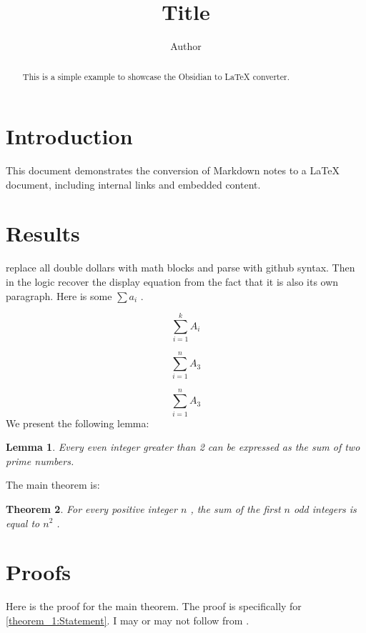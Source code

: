 \documentclass{article}
\title{Title}
\author{Author}
\newtheorem{theorem}{Theorem}
\newtheorem{lemma}[theorem]{Lemma}
\begin{document}
\maketitle
\begin{abstract}
This is a simple example to showcase the Obsidian to LaTeX converter.


\end{abstract}

\section{Introduction}\label{section:Introduction}
This document demonstrates the conversion of Markdown notes to a LaTeX document, including internal links and embedded content.

\section{Results}\label{section:Results}
replace all double dollars with math blocks and parse with github syntax. Then in the logic recover the display equation from the fact that it is also its own paragraph.
Here is some  $\sum a_i$ .

\begin{equation*}
\sum_{i=1}^k A_i
\end{equation*}

\begin{equation*}
\sum_{i=1}^n A_3
\end{equation*}

\begin{equation*}
\sum_{i=1}^n A_3
\end{equation*}
We present the following lemma:

\begin{lemma}
\label{lemma_1}
Every even integer greater than 2 can be expressed as the sum of two prime numbers.


\end{lemma}

The main theorem is:

\begin{theorem}
\label{theorem_1}
For every positive integer  $n$ , the sum of the first  $n$  odd integers is equal to  $n^2$ .


\end{theorem}


\section{Proofs}\label{section:Proofs}
Here is the proof for the main theorem. The proof is specifically for \autoref{theorem_1:Statement}. I may or may not follow from \cite{rudelsonSparseReconstructionFourier2008}.
\end{document}
